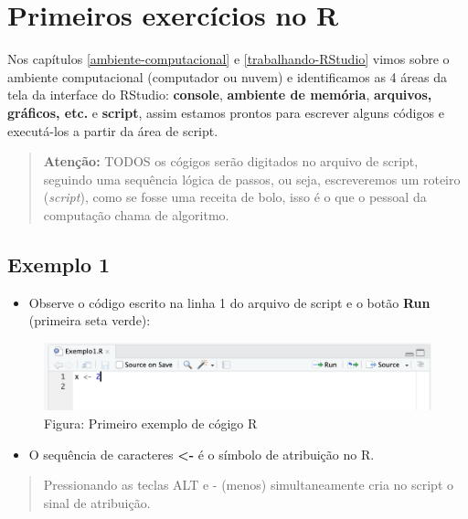 \documentclass[
]{book}
\providecommand{\tightlist}{%
  \setlength{\itemsep}{0pt}\setlength{\parskip}{0pt}}
\begin{document}
\chapter{Primeiros exercícios no R}\label{primeiros-exercuxedcios-no-r}

Nos capítulos \ref{ambiente-computacional} e \ref{trabalhando-RStudio} vimos sobre o ambiente computacional (computador ou nuvem) e identificamos as 4 áreas da tela da interface do RStudio: \textbf{console}, \textbf{ambiente de memória}, \textbf{arquivos, gráficos, etc.} e \textbf{script}, assim estamos prontos para escrever alguns códigos e executá-los a partir da área de script.

\begin{quote}
\textbf{Atenção:} TODOS os cógigos serão digitados no arquivo de script, seguindo uma sequência lógica de passos, ou seja, escreveremos um roteiro (\emph{script}), como se fosse uma receita de bolo, isso é o que o pessoal da computação chama de algoritmo.
\end{quote}

\section{Exemplo 1}\label{exemplo-1}

\begin{itemize}
\tightlist
\item
  Observe o código escrito na linha 1 do arquivo de script e o botão \textbf{Run} (primeira seta verde):
\end{itemize}

\begin{figure}
\centering
\includegraphics{telaExemplo1.png}
\caption{Figura: Primeiro exemplo de cógigo R}
\end{figure}

\begin{itemize}
\tightlist
\item
  O sequência de caracteres \textbf{\textless-} é o símbolo de atribuição no R.
\end{itemize}

\begin{quote}
Pressionando as teclas ALT e - (menos) simultaneamente cria no script o sinal de atribuição.
\end{quote}
\end{document}
